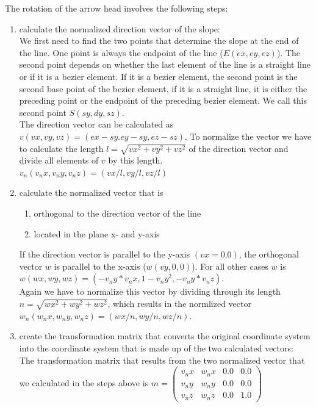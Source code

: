 The rotation of the arrow head involves the following steps:

\begin{enumerate}
\item{calculate the normalized direction vector of the slope:\\
We first need to find the two points that determine the slope at the end of the line. One point is always the endpoint of 
the line ($E(ex,ey,ez)$). The second point depends on whether the last element of the line is a straight line or if it is
a bezier element. If it is a bezier element, the second point is the second base point of the bezier element, if it is a 
straight line, it is either the preceding point or the endpoint of the preceding bezier element. We call this second
point $S(sy,dy,sz)$.\\ The direction vector can be calculated as $v(vx,vy,vz)=(ex-sy.ey-sy,ez-sz)$. To normalize the vector
we have to calculate the length $l=\sqrt{vx^2+vy^2+vz^2}$ of the direction vector and divide all elements of $v$ by this
length. $v_n(v_{n}x,v_{n}y,v_{n}z)=(vx/l,vy/l,vz/l)$}

\item{calculate the normalized vector that is
\begin{enumerate}
\item{orthogonal to the direction vector of the line}
\item{located in the plane x- and y-axis}
\end{enumerate}
If the direction vector is parallel to the y-axis $(vx=0.0)$, the orthogonal vector $w$ is parallel to the x-axis ($w(vy,0,0)$).
For all other cases $w$ is $w(wx,wy,wz)=(-v_{n}y*v_{n}x,1-v_{n}y^2,-v_{n}y*v_{n}z)$.\\ Again we have to normalize this
vector by dividing through its length $n=\sqrt{wx^2+wy^2+wz^2}$, which results in the normlized vector\\
$w_n(w_{n}x,w_{n}y,w_{n}z)=(wx/n,wy/n,wz/n)$.
}
\item{create the transformation matrix that converts the original coordinate system into the coordinate system
that is made up of the two calculated vectors:\\
\vspace*{0.3cm}
The transformation matrix that results from the two normalized vector that we calculated in the steps above
is $m=\left(\begin{array}{cccc} v_{n}x & w_{n}x & 0.0 & 0.0\\ v_{n}y & w_{n}y & 0.0 & 0.0\\ v_{n}z & w_{n}z & 0.0 & 1.0 \end{array}\right)$}
\end{enumerate}


